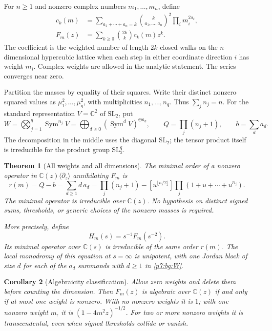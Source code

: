 \documentclass[11pt,a4paper]{article}
\newtheorem{theorem}{Theorem}[section]
\newtheorem{corollary}[theorem]{Corollary}
\theoremstyle{definition}
\theoremstyle{remark}
\numberwithin{equation}{section}
\begin{document}
For $n\ge1$ and nonzero complex numbers $m_1,\ldots,m_n$, define
\begin{align}
 c_k(m)&=\sum_{a_1+\cdots+a_n=k}
       \binom{k}{a_1,\ldots,a_n}^{\!2}\prod_i m_i^{2a_i},\\
 F_m(z)&=\sum_{k\ge0}\binom{2k}{k}c_k(m)z^k.
 \label{p7:bg:F}
\end{align}
The coefficient is the weighted number of length-$2k$ closed walks
on the $n$-dimensional hypercubic lattice when each step in either
coordinate direction $i$ has weight $m_i$.  Complex weights are
allowed in the analytic statement.  The series converges near zero.

Partition the masses by equality of their squares.  Write their
distinct nonzero squared values as $\mu_1^2,\ldots,\mu_q^2$, with
multiplicities $n_1,\ldots,n_q$.  Thus $\sum_jn_j=n$.  For the
standard representation $V=\mathbb C^2$ of $\mathrm{SL}_2$, put
\begin{equation}\label{p7:bg:W}
 W=\bigotimes_{j=1}^q\operatorname{Sym}^{n_j}V
     =\bigoplus_{d\ge0}(\operatorname{Sym}^dV)^{\oplus a_d},
 \qquad Q=\prod_j(n_j+1),\qquad b=\sum_da_d.
\end{equation}
The decomposition in the middle uses the diagonal $\mathrm{SL}_2$;
the tensor product itself is irreducible for the product group
$\mathrm{SL}_2^q$.

\begin{theorem}[All weights and all dimensions]\label{p7:bg:main}
The minimal order of a nonzero operator in
$\mathbb C(z)\langle\partial_z\rangle$ annihilating $F_m$ is
\begin{equation}\label{p7:bg:rank}
 r(m)=Q-b=\sum_{d\ge1}d\,a_d
 =\prod_j(n_j+1)
   -[u^{\lfloor n/2\rfloor}]\prod_j(1+u+\cdots+u^{n_j}).
\end{equation}
The minimal operator is irreducible over $\mathbb C(z)$.
No hypothesis on distinct signed sums, thresholds, or generic
choices of the nonzero masses is required.

More precisely, define
\[
 H_m(s)=s^{-1}F_m(s^{-2}).
\]
Its minimal operator over $\mathbb C(s)$ is irreducible of the
same order $r(m)$.  The local monodromy of this equation at
$s=\infty$ is unipotent, with one Jordan block of size $d$ for
each of the $a_d$ summands with $d\ge1$ in \eqref{p7:bg:W}.
\end{theorem}

\begin{corollary}[Algebraicity classification]\label{p7:bg:alg}
Allow zero weights and delete them before counting the dimension.
Then $F_m(z)$ is algebraic over $\mathbb C(z)$ if and only if at
most one weight is nonzero.  With no nonzero weights it is $1$;
with one nonzero weight $m$, it is $(1-4m^2z)^{-1/2}$.
For two or more nonzero weights it is transcendental, even when
signed thresholds collide or vanish.
\end{corollary}
\end{document}
